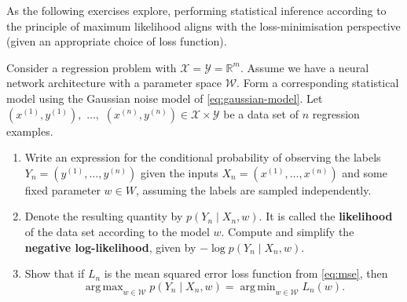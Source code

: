 \documentclass[11pt]{article}
\newcommand{\R}{\mathbb{R}}
\DeclareMathOperator*{\argmin}{arg\,min}
\DeclareMathOperator*{\argmax}{arg\,max}
\newcommand{\X}{\mathcal{X}}
\newcommand{\Y}{\mathcal{Y}}
\newcommand{\W}{\mathcal{W}}
\begin{document}
As the following exercises explore, performing statistical inference according
to the principle of maximum likelihood aligns with the loss-minimisation
perspective (given an appropriate choice of loss function).

\begin{exercise}
    \label{ex:nll-mse}
    Consider a regression problem with $\X = \Y = \R^m$. Assume we have a
    neural network architecture with a parameter space $\W$. Form a
    corresponding statistical model using the Gaussian noise model of
    \eqref{eq:gaussian-model}.
    Let 
        $(x^{(1)}, y^{(1)}),$ $\ldots,$ $(x^{(n)}, y^{(n)}) \in \X \times \Y$
    be a data set of $n$ regression examples. 
\begin{enumerate}
    \item
        Write an expression for the conditional probability of
        observing the labels
            $Y_n = (y^{(1)}, \ldots, y^{(n)})$
        given the inputs
            $X_n = (x^{(1)}, \ldots, x^{(n)})$
        and some fixed parameter $w \in W$, assuming the labels are sampled
        independently.
    \item
        Denote the resulting quantity by
            $p(Y_n \mid X_n, w)$.
        It is called the \textbf{likelihood} of the data set according to the
        model $w$. Compute and simplify the \textbf{negative log-likelihood},
        given by $-\log p(Y_n \mid X_n, w)$.
    \item
        Show that if $L_n$ is the mean squared error loss function from
        \eqref{eq:mse}, then
        $$
            \argmax_{w \in \W} p(Y_n \mid X_n, w)
            =
            \argmin_{w \in \W} L_n(w)
        .$$
\end{enumerate}
\end{exercise}
\end{document}
